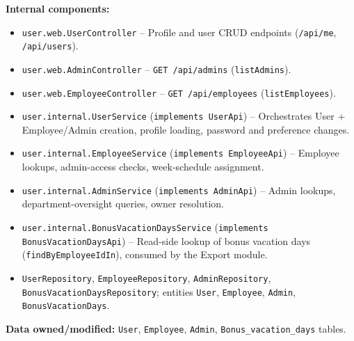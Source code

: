 \documentclass[11pt,a4paper]{article}
\begin{document}
\textbf{Internal components:}
\begin{itemize}[leftmargin=1.5em]
    \item \texttt{user.web.UserController} -- Profile and user CRUD endpoints (\texttt{/api/me}, \texttt{/api/users}).
    \item \texttt{user.web.AdminController} -- \texttt{GET /api/admins} (\texttt{listAdmins}).
    \item \texttt{user.web.EmployeeController} -- \texttt{GET /api/employees} (\texttt{listEmployees}).
    \item \texttt{user.internal.UserService} (\texttt{implements UserApi}) -- Orchestrates User + Employee/Admin creation, profile loading, password and preference changes.
    \item \texttt{user.internal.EmployeeService} (\texttt{implements EmployeeApi}) -- Employee lookups, admin-access checks, week-schedule assignment.
    \item \texttt{user.internal.AdminService} (\texttt{implements AdminApi}) -- Admin lookups, department-oversight queries, owner resolution.
    \item \texttt{user.internal.BonusVacationDaysService} (\texttt{implements BonusVacationDaysApi}) -- Read-side lookup of bonus vacation days (\texttt{findByEmployeeIdIn}), consumed by the Export module.
    \item \texttt{UserRepository}, \texttt{EmployeeRepository}, \texttt{AdminRepository}, \texttt{BonusVacationDaysRepository}; entities \texttt{User}, \texttt{Employee}, \texttt{Admin}, \texttt{BonusVacationDays}.
\end{itemize}

\textbf{Data owned/modified:} \texttt{User}, \texttt{Employee}, \texttt{Admin}, \texttt{Bonus\_vacation\_days} tables.
\end{document}
